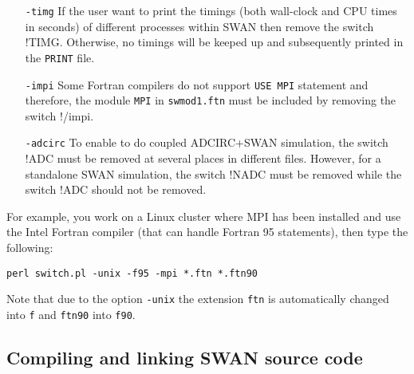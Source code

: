 \documentclass[12pt]{book}
\begin{document}
\begin{itemize}
  \item[{\tt -timg}]
  If the user want to print the timings (both wall-clock and CPU times in seconds) of different
  processes within SWAN then remove the switch !TIMG. Otherwise, no timings will be keeped up
  and subsequently printed in the {\tt PRINT} file.
  \item[{\tt -impi}]
  Some Fortran compilers do not support {\tt USE MPI} statement and therefore,
  the module {\tt MPI} in {\tt swmod1.ftn} must be included by removing the switch !/impi.
  \item[{\tt -adcirc}]
  To enable to do coupled ADCIRC+SWAN simulation, the switch !ADC must be removed at several places
  in different files. However, for a standalone SWAN simulation, the switch !NADC must be
  removed while the switch !ADC should not be removed.
\end{itemize}

\noindent
For example, you work on a Linux cluster where MPI has been installed and use the Intel Fortran
compiler (that can handle Fortran 95 statements), then type the following:
\begin{verbatim}
perl switch.pl -unix -f95 -mpi *.ftn *.ftn90
\end{verbatim}
Note that due to the option {\tt -unix} the extension {\tt ftn} is automatically changed into {\tt f}
and {\tt ftn90} into {\tt f90}.

\subsection{Compiling and linking SWAN source code}
\end{document}
